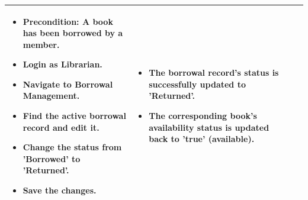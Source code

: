 \begin{longtable}{|>{\scriptsize\raggedright\arraybackslash}p{3cm}|>{\raggedright\arraybackslash}p{3.5cm}|>{\raggedright\arraybackslash}p{4.5cm}|>{\raggedright\arraybackslash}p{4.5cm}|}
\begin{itemize}[noitemsep, topsep=0pt, partopsep=0pt, leftmargin=*]
        \item Precondition: A book has been borrowed by a member.
        \item Login as Librarian.
        \item Navigate to Borrowal Management.
        \item Find the active borrowal record and edit it.
        \item Change the status from 'Borrowed' to 'Returned'. 
        \item Save the changes.
    \end{itemize} & 
    \begin{itemize}[noitemsep, topsep=0pt, partopsep=0pt, leftmargin=*]
        \item The borrowal record's status is successfully updated to 'Returned'.
        \item The corresponding book's availability status is updated back to 'true' (available).
    \end{itemize} \\ \hline

\end{longtable}
